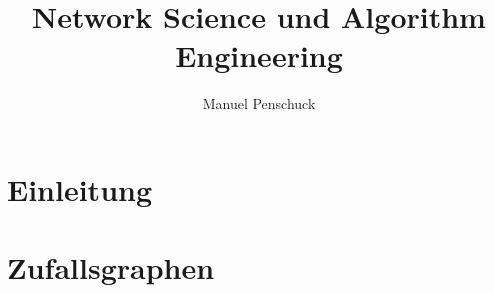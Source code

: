 \documentclass[%
	11pt,%
	german,%
]{book}
\title{Network Science und Algorithm Engineering}
\author{Manuel Penschuck}
\begin{document}
\maketitle

\clearpage

\tableofcontents

\chapter{Einleitung}


\chapter{Zufallsgraphen}


\cleardoublepage
{}
\fancyhead[RO]{}
\thispagestyle{fancy}
\pagestyle{fancy}

\small
\patchcmd{\thebibliography}{\chapter*}{\section*}{}{}

\end{document}
